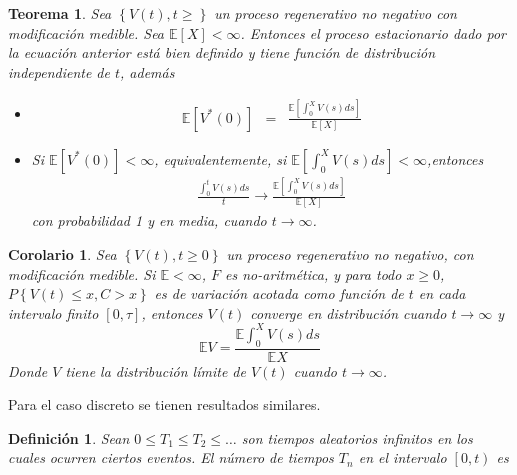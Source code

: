 \documentclass{article}
\newtheorem{Def}{Definición}[section]
\newtheorem{Teo}{Teorema}[section]
\newtheorem{Coro}{Corolario}[section]
\newcommand{\esp}{\mathbb{E}}
\numberwithin{equation}{section}
\begin{document}
{\begin{Teo}
Sea $\left\{V\left(t\right),t\geq\right\}$ un proceso regenerativo no negativo con modificaci\'on medible. Sea $\esp\left[X\right]<\infty$. Entonces el proceso estacionario dado por la ecuaci\'on anterior est\'a bien definido y tiene funci\'on de distribuci\'on independiente de $t$, adem\'as
\begin{itemize}
\item[i)] \begin{eqnarray*}
\esp\left[V^{*}\left(0\right)\right]&=&\frac{\esp\left[\int_{0}^{X}V\left(s\right)ds\right]}{\esp\left[X\right]}\end{eqnarray*}
\item[ii)] Si $\esp\left[V^{*}\left(0\right)\right]<\infty$, equivalentemente, si $\esp\left[\int_{0}^{X}V\left(s\right)ds\right]<\infty$,entonces
\begin{eqnarray*}
\frac{\int_{0}^{t}V\left(s\right)ds}{t}\rightarrow\frac{\esp\left[\int_{0}^{X}V\left(s\right)ds\right]}{\esp\left[X\right]}
\end{eqnarray*}
con probabilidad 1 y en media, cuando $t\rightarrow\infty$.
\end{itemize}
\end{Teo}

\begin{Coro}
Sea $\left\{V\left(t\right),t\geq0\right\}$ un proceso regenerativo no negativo, con modificaci\'on medible. Si $\esp <\infty$, $F$ es no-aritm\'etica, y para todo $x\geq0$, $P\left\{V\left(t\right)\leq x,C>x\right\}$ es de variaci\'on acotada como funci\'on de $t$ en cada intervalo finito $\left[0,\tau\right]$, entonces $V\left(t\right)$ converge en distribuci\'on  cuando $t\rightarrow\infty$ y $$\esp V=\frac{\esp \int_{0}^{X}V\left(s\right)ds}{\esp X}$$
Donde $V$ tiene la distribuci\'on l\'imite de $V\left(t\right)$ cuando $t\rightarrow\infty$.

\end{Coro}

Para el caso discreto se tienen resultados similares.




\begin{Def}%
Sean $0\leq T_{1}\leq T_{2}\leq \ldots$ son tiempos aleatorios infinitos en los cuales ocurren ciertos eventos. El n\'umero de tiempos $T_{n}$ en el intervalo $\left[0,t\right)$ es


\end{Def}}
\end{document}
